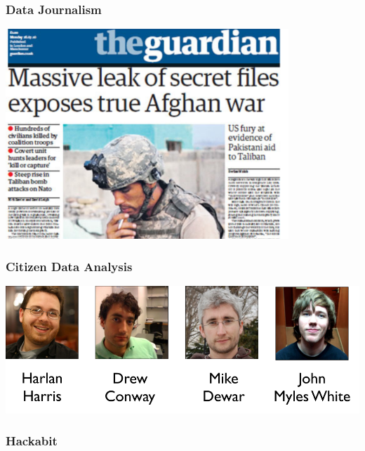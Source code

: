 \documentclass[xcolor=dvipsnames, 9pt]{beamer}
\begin{document}
\begin{frame}
    \frametitle{Data Journalism}
    \begin{center}
    \includegraphics[width=0.8\textwidth]{guardian.png}
    \end{center}
\end{frame}

\begin{frame}
    \frametitle{Citizen Data Analysis}
    \begin{center}
    \includegraphics[width=\textwidth]{hackademics.png}
    \end{center}
\end{frame}

{
\begin{frame}
    \frametitle{Hackabit}
\end{frame}
}
\end{document}
